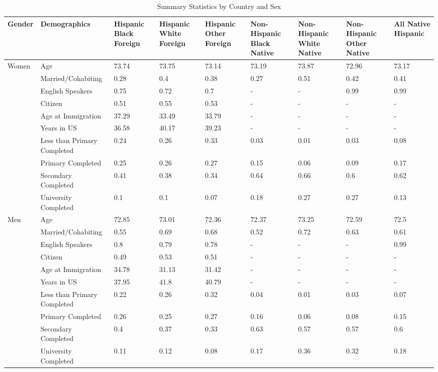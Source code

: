 \documentclass[
]{article}
\begin{document}
\begin{landscape}
\begin{table}[ht]
\centering
\caption{Summary Statistics by Country and Sex} 
\label{table3}
\begingroup\small
\begin{tabular}{l|l|p{1.5cm}p{1.5cm}p{1.5cm}p{1.5cm}p{1.5cm}p{1.5cm}p{1.5cm}}
  \hline
Gender & Demographics & Hispanic Black Foreign & Hispanic White Foreign & Hispanic Other Foreign & Non-Hispanic Black Native & Non-Hispanic White Native & Non-Hispanic Other Native & All Native Hispanic \\ 
  \hline
Women & Age & 73.74 & 73.75 & 73.14 & 73.19 & 73.87 & 72.96 & 73.17 \\ 
   & Married/Cohabiting & 0.28 & 0.4 & 0.38 & 0.27 & 0.51 & 0.42 & 0.41 \\ 
   & English Speakers & 0.75 & 0.72 & 0.7 & - & - & 0.99 & 0.99 \\ 
   & Citizen & 0.51 & 0.55 & 0.53 & - & - & - & - \\ 
   & Age at Immigration & 37.29 & 33.49 & 33.79 & - & - & - & - \\ 
   & Years in US & 36.58 & 40.17 & 39.23 & - & - & - & - \\ 
   & Less than Primary Completed & 0.24 & 0.26 & 0.33 & 0.03 & 0.01 & 0.03 & 0.08 \\ 
   & Primary Completed & 0.25 & 0.26 & 0.27 & 0.15 & 0.06 & 0.09 & 0.17 \\ 
   & Secondary Completed & 0.41 & 0.38 & 0.34 & 0.64 & 0.66 & 0.6 & 0.62 \\ 
   & University Completed & 0.1 & 0.1 & 0.07 & 0.18 & 0.27 & 0.27 & 0.13 \\ 
  Men & Age & 72.85 & 73.01 & 72.36 & 72.37 & 73.25 & 72.59 & 72.5 \\ 
   & Married/Cohabiting & 0.55 & 0.69 & 0.68 & 0.52 & 0.72 & 0.63 & 0.61 \\ 
   & English Speakers & 0.8 & 0.79 & 0.78 & - & - & - & 0.99 \\ 
   & Citizen & 0.49 & 0.53 & 0.51 & - & - & - & - \\ 
   & Age at Immigration & 34.78 & 31.13 & 31.42 & - & - & - & - \\ 
   & Years in US & 37.95 & 41.8 & 40.79 & - & - & - & - \\ 
   & Less than Primary Completed & 0.22 & 0.26 & 0.32 & 0.04 & 0.01 & 0.03 & 0.07 \\ 
   & Primary Completed & 0.26 & 0.25 & 0.27 & 0.16 & 0.06 & 0.08 & 0.15 \\ 
   & Secondary Completed & 0.4 & 0.37 & 0.33 & 0.63 & 0.57 & 0.57 & 0.6 \\ 
   & University Completed & 0.11 & 0.12 & 0.08 & 0.17 & 0.36 & 0.32 & 0.18 \\ 
   \hline
\end{tabular}
\endgroup
\end{table}


\end{landscape}
\end{document}
